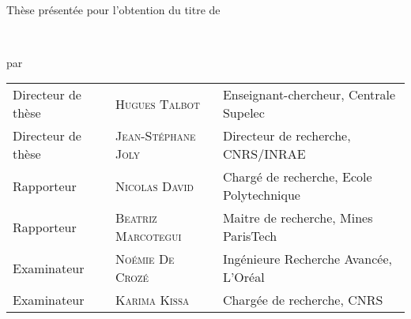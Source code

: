 
\begin{titlepage}

\begin{addmargin}[-1cm]{-3cm}
\begin{center}

\hfill
\vfill

\large
\myUni \\
\myDepartment 
\normalsize

\vfill

Thèse présentée pour l'obtention du titre de \\

\large \myDegree
\normalsize

\vfill

\begingroup
\color{Maroon}\spacedallcaps{\myTitle} \\ \bigskip %
\mySubtitle
\endgroup

par

\large
\spacedlowsmallcaps{\myName} %
\normalsize
\vfill


\myTime

\begin{tabularx}{\linewidth}{lll}
    Directeur de thèse & \textsc{Hugues Talbot} & Enseignant-chercheur, Centrale Supelec\\
    Directeur de thèse & \textsc{Jean-Stéphane Joly} & Directeur de recherche, CNRS/INRAE\\
    Rapporteur & \textsc{Nicolas David} & Chargé de recherche, Ecole Polytechnique\\ %
    Rapporteur & \textsc{Beatriz Marcotegui} & Maitre de recherche, Mines ParisTech\\
    Examinateur & \textsc{Noémie De Crozé} & Ingénieure Recherche Avancée, L'Oréal\\ %
    Examinateur & \textsc{Karima Kissa} & Chargée de recherche, CNRS
\end{tabularx}

\vfill

\end{center}
\end{addmargin}

\end{titlepage}
